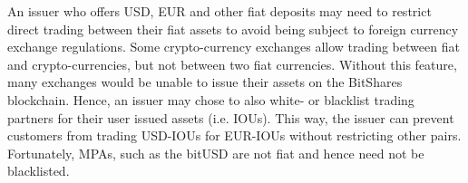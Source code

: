 An issuer who offers USD, EUR and other fiat deposits may need to restrict
direct trading between their fiat assets to avoid being subject to foreign
currency exchange regulations. Some crypto-currency exchanges allow trading
between fiat and crypto-currencies, but not between two fiat currencies.
Without this feature, many exchanges would be unable to issue their assets on
the BitShares blockchain. Hence, an issuer may chose to also white- or
blacklist trading partners for their user issued assets (i.e. IOUs). This way,
the issuer can prevent customers from trading USD-IOUs for EUR-IOUs without
restricting other pairs. Fortunately, MPAs, such as the bitUSD are not fiat and
hence need not be blacklisted.
